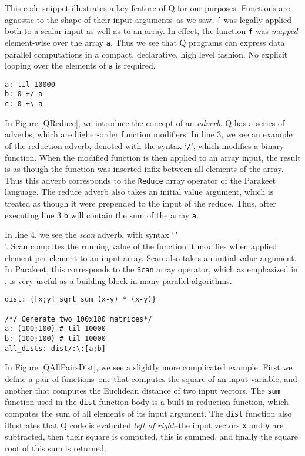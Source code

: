 \documentclass[preprint]{sigplanconf}
\begin{document}
This code snippet illustrates a key feature of Q for our purposes.  Functions
are agnostic to the shape of their input arguments--as we saw, \texttt{f} was
legally applied both to a scalar input as well as to an array.  In effect, the
function \texttt{f} was {\it mapped} element-wise over the array \texttt{a}.
Thus we see that Q programs can express data parallel computations in a compact,
declarative, high level fashion.  No explicit looping over the elements of
\texttt{a} is required.

\begin{lstlisting}[caption=Q Reductions Example]
a: til 10000
b: 0 +/ a
c: 0 +\ a
\end{lstlisting}
\label{QReduce}


In Figure \ref{QReduce}, we introduce the concept of an \emph{adverb}.  Q has a
series of adverbs, which are higher-order function modifiers.  In
line 3, we see an example of the reduction adverb, denoted with the syntax
`\texttt{/}', which modifies a binary function. When the modified function is
then applied to an array input, the result is as though the function was
inserted infix between all elements of the array.  Thus this adverb corresponds
to the \texttt{Reduce} array operator of the Parakeet language.  The reduce
adverb also takes an initial value argument, which is treated as though it were
prepended to the input of the reduce.  Thus, after executing line 3 \texttt{b}
will contain the sum of the array \texttt{a}.

In line 4, we see the \emph{scan} adverb, with syntax `\texttt{\char`\\}'.
Scan computes the running value of the function it modifies when applied
element-per-element to an input array. Scan also takes an initial value
argument.  In Parakeet, this corresponds to the \texttt{Scan} array operator,
which as emphasized in \cite{Blel90}, is very useful as a building block in many
parallel algorithms.

\begin{lstlisting}[caption=Q All-Pairs Distance Example]
dist: {[x;y] sqrt sum (x-y) * (x-y)}

/*/ Generate two 100x100 matrices*/
a: (100;100) # til 10000
b: (100;100) # til 10000
all_dists: dist/:\:[a;b]
\end{lstlisting}
\label{QAllPairsDist}

In Figure \ref{QAllPairsDist}, we see a slightly more complicated example.
First we define a pair of functions--one that computes the square of an input
variable, and another that computes the Euclidean distance of two input
vectors.  The \texttt{sum} function used in the \texttt{dist} function body is a
built-in reduction function, which computes the sum of all elements of its input
argument.  The \texttt{dist} function also illustrates that Q code is evaluated
\emph{left of right}--the input vectors \texttt{x} and \texttt{y} are
subtracted, then their square is computed, this is summed, and finally the
square root of this sum is returned.
\end{document}

